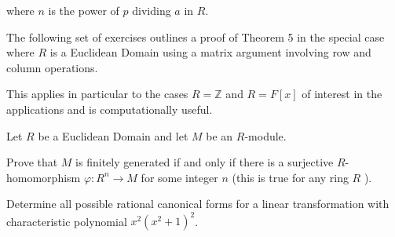 where $n$ is the power of $p$ dividing $a$ in $R$.

The following set of exercises outlines a proof of Theorem 5 in the special case where $R$ is a Euclidean Domain using a matrix argument involving row and column operations.

This applies in particular to the cases $R=\mathbb{Z}$ and $R=F[x]$ of interest in the applications and is computationally useful.

Let $R$ be a Euclidean Domain and let $M$ be an $R$-module.

Prove that $M$ is finitely generated if and only if there is a surjective $R$-homomorphism $\varphi: R^n \rightarrow M$ for some integer $n$ (this is true for any ring $R$ ).

Determine all possible rational canonical forms for a linear transformation with characteristic polynomial $x^2\left(x^2+1\right)^2$.